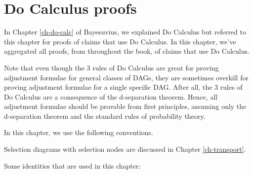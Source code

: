 \chapter{Do Calculus proofs}
\label{ch-do-calc-proofs}

In Chapter \ref{ch-do-calc}
of Bayesuvius,
we explained Do Calculus
but referred to this
chapter for proofs
of claims that
use Do Calculus.
In this chapter, we've
aggregated
 all proofs, from
throughout the book,
of claims that use Do Calculus.

Note that even though the 3
rules of Do Calculus
are great for proving
adjustment formulae
for general classes of DAGs,
they are sometimes overkill
for proving
 adjustment formulae
for a single specific DAG.
After all,  the
 3 rules of Do Calculus
are a consequence
of the d-separation theorem.
Hence, all adjustment
formulae should be
provable from first principles,
assuming only
the d-separation theorem
and the standard rules of
probability theory.

In this chapter, we use the
 following conventions.

\bnetInstantiations

\hiddenNodes

Selection diagrams
with selection nodes 
 are discussed 
in Chapter \ref{ch-transport}.
\selectionGraphs

Some identities
that are used in this chapter:

